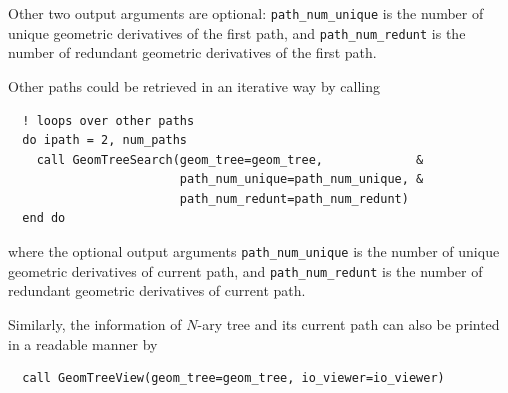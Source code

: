 \documentclass[a4paper,11pt,twoside,openright]{book}
\begin{document}
Other two output arguments are optional: \verb|path_num_unique| is the number of unique
geometric derivatives of the first path, and \verb|path_num_redunt| is the number of redundant
geometric derivatives of the first path.

Other paths could be retrieved in an iterative way by calling
\begin{verbatim}
  ! loops over other paths
  do ipath = 2, num_paths
    call GeomTreeSearch(geom_tree=geom_tree,             &
                        path_num_unique=path_num_unique, &
                        path_num_redunt=path_num_redunt)
  end do
\end{verbatim}
where the optional output arguments \verb|path_num_unique| is the number of unique
geometric derivatives of current path, and \verb|path_num_redunt| is the number of redundant
geometric derivatives of current path.

Similarly, the information of $N$-ary tree and its current path can also be printed in a readable
manner by
\begin{verbatim}
  call GeomTreeView(geom_tree=geom_tree, io_viewer=io_viewer)
\end{verbatim}
\end{document}
